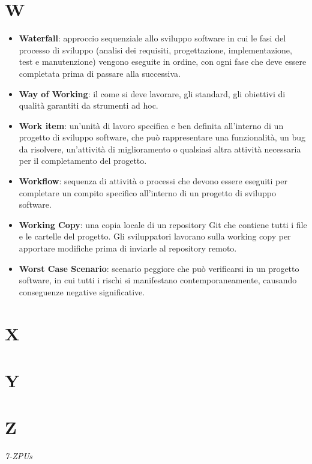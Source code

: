 \documentclass[a4paper,12pt]{article}
\begin{document}
\section{W}
\begin{itemize}
    \item \textbf{Waterfall}: approccio sequenziale allo sviluppo software in cui le fasi del processo di sviluppo (analisi dei requisiti, progettazione, implementazione, test e manutenzione) vengono eseguite in ordine, con ogni fase che deve essere completata prima di passare alla successiva. 
    \item \textbf{Way of Working}: il come si deve lavorare, gli standard, gli obiettivi di qualità garantiti da strumenti ad hoc.
\end{itemize}
\begin{itemize}
    \item \textbf{Work item}: un'unità di lavoro specifica e ben definita all'interno di un progetto di sviluppo software, che può rappresentare una funzionalità, un bug da risolvere, un'attività di miglioramento o qualsiasi altra attività necessaria per il completamento del progetto.
    \item \textbf{Workflow}: sequenza di attività o processi che devono essere eseguiti per completare un compito specifico all'interno di un progetto di sviluppo software. 
    \item \textbf{Working Copy}: una copia locale di un repository Git che contiene tutti i file e le cartelle del progetto. Gli sviluppatori lavorano sulla working copy per apportare modifiche prima di inviarle al repository remoto.
    \item \textbf{Worst Case Scenario}: scenario peggiore che può verificarsi in un progetto software, in cui tutti i rischi si manifestano contemporaneamente, causando conseguenze negative significative.
\end{itemize}
\section{X}
\section{Y}
\section{Z}


\vfill
\begin{flushright}
    \textit{7-ZPUs}
\end{flushright}
\end{document}
